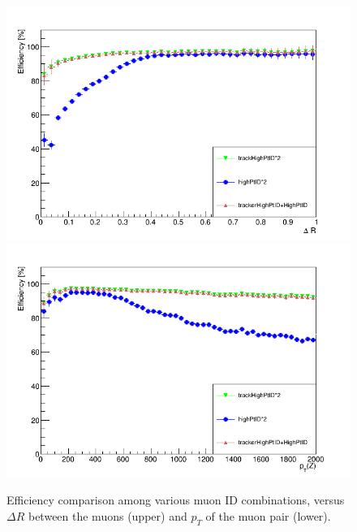 \begin{figure}[htbp]
\begin{center}
\includegraphics[width=0.9\linewidth]{figures/sel_mudreff.png}
\includegraphics[width=0.9\linewidth]{figures/sel_muzpteff.png}
\caption{Efficiency comparison among various muon ID combinations, versus $\Delta R$ between the muons (upper) and $p_T$ of the muon pair (lower).}
\label{fig:sel_mumueff}
\end{center}
\end{figure}

